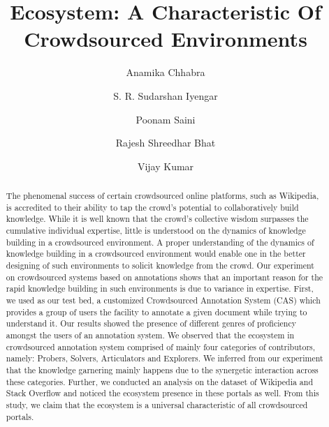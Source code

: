 \documentclass{llncs}
\begin{document}
\title{Ecosystem: A Characteristic Of Crowdsourced Environments}


\author{Anamika Chhabra \and S. R. Sudarshan Iyengar \and Poonam Saini \and Rajesh Shreedhar Bhat  \and Vijay Kumar }
\maketitle

\begin{abstract}

The phenomenal success of certain crowdsourced online platforms, such as Wikipedia, is accredited to their ability to tap the crowd's potential to collaboratively build knowledge. While it is well known that the crowd's collective wisdom surpasses the cumulative individual expertise, little is understood on the dynamics of knowledge building in a crowdsourced environment. A proper understanding of the dynamics of knowledge building in a crowdsourced environment would enable one in the better designing of such environments to solicit knowledge from the crowd. Our experiment on crowdsourced systems based on annotations shows that an important reason for the rapid knowledge building in such environments is due to variance in expertise. First, we used as our test bed, a customized Crowdsourced Annotation System (CAS) which provides a group of users the facility to annotate a given document while trying to understand it. Our results showed the presence of different genres of proficiency amongst the users of an annotation system. We observed that the ecosystem in crowdsourced annotation system comprised of mainly four categories of contributors, namely: Probers, Solvers, Articulators and Explorers. We inferred from our experiment that the knowledge garnering mainly happens due to the synergetic interaction across these categories. Further, we conducted an analysis on the dataset of Wikipedia and Stack Overflow and noticed the ecosystem presence in these portals as well. From this  study, we claim that the ecosystem is a universal characteristic of all crowdsourced portals.
\end{abstract}
\end{document}
